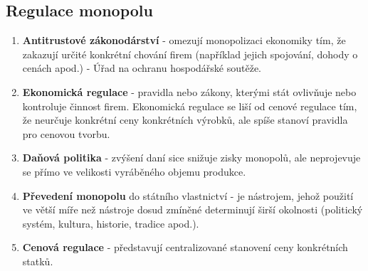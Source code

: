 \subsection{Regulace monopolu}
\begin{enumerate}
    \item \textbf{Antitrustové zákonodárství} - omezují monopolizaci ekonomiky tím, že zakazují určité
    konkrétní chování firem (například jejich spojování, dohody o cenách apod.) - Úřad na
    ochranu hospodářské soutěže.
    \item \textbf{Ekonomická regulace} - pravidla nebo zákony, kterými stát ovlivňuje nebo
    kontroluje činnost firem. Ekonomická regulace se liší od cenové regulace tím, že neurčuje
    konkrétní ceny konkrétních výrobků, ale spíše stanoví pravidla pro cenovou tvorbu.
    \item \textbf{Daňová politika} - zvýšení daní sice snižuje zisky monopolů, ale neprojevuje se přímo
    ve velikosti vyráběného objemu produkce.
    \item \textbf{Převedení monopolu} do státního vlastnictví - je nástrojem, jehož použití ve větší míře než
    nástroje dosud zmíněné determinují širší okolnosti (politický systém, kultura, historie,
    tradice apod.).
    \item \textbf{Cenová regulace} - představují centralizované stanovení ceny konkrétních statků.
\end{enumerate}